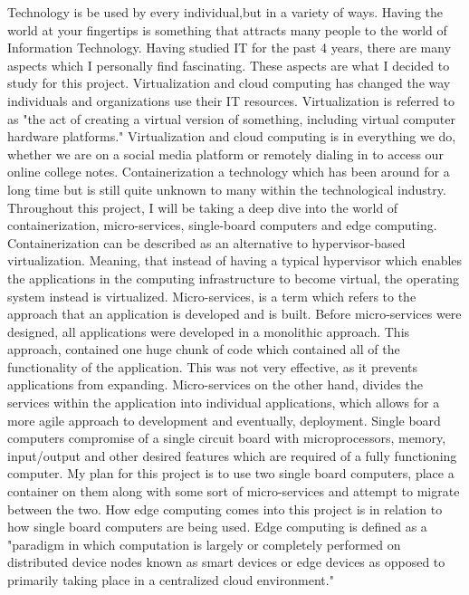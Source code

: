 Technology is be used by every individual,but in a variety of ways. Having the world at your fingertips is something that attracts many people to the world of Information Technology. Having studied IT for the past 4 years, there are many aspects which I personally find fascinating. These aspects are what I decided to study for this project. Virtualization and cloud computing has changed the way individuals and organizations use their IT resources. Virtualization is referred to as "the act of creating a virtual version of something, including virtual computer hardware platforms." Virtualization and cloud computing is in everything we do, whether we are on a social media platform or remotely dialing in to access our online college notes. Containerization a technology which has been around for a long time but is still quite unknown to many within the technological industry. Throughout this project, I will be taking a deep dive into the world of containerization, micro-services, single-board computers and edge computing. Containerization can be described as an alternative to hypervisor-based virtualization. Meaning, that instead of having a typical hypervisor which enables the applications in the computing infrastructure to become virtual, the operating system instead is virtualized. Micro-services, is a term which refers to the approach that an application is developed and is built. Before micro-services were designed, all applications were developed in a monolithic approach. This approach, contained one huge chunk of code which contained all of the functionality of the application. This was not very effective, as it prevents applications from expanding. Micro-services on the other hand, divides the services within the application into individual applications, which allows for a more agile approach to development and eventually, deployment. Single board computers compromise of a single circuit board with microprocessors, memory, input/output and other desired features which are required of a fully functioning computer. My plan for this project is to use two single board computers, place a container on them along with some sort of micro-services and attempt to migrate between the two. How edge computing comes into this project is in relation to how single board computers are being used. Edge computing is defined as a "paradigm in which computation is largely or completely performed on distributed device nodes known as smart devices or edge devices as opposed to primarily taking place in a centralized cloud environment." \cite{Reference15}



